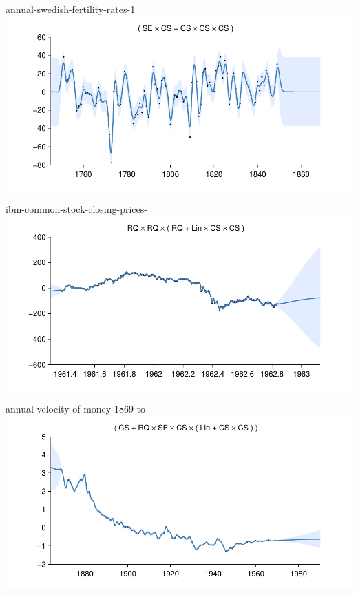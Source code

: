\begin{frame}{annual-swedish-fertility-rates-1}
  \center
  \includegraphics[width=1.0\textwidth]{figures/annual-swedish-fertility-rates-1/annual-swedish-fertility-rates-1_all}
\end{frame}  

\begin{frame}{ibm-common-stock-closing-prices-}
  \center
  \includegraphics[width=1.0\textwidth]{figures/ibm-common-stock-closing-prices-/ibm-common-stock-closing-prices-_all}
\end{frame}  

\begin{frame}{annual-velocity-of-money-1869-to}
  \center
  \includegraphics[width=1.0\textwidth]{figures/annual-velocity-of-money-1869-to/annual-velocity-of-money-1869-to_all}
\end{frame}

